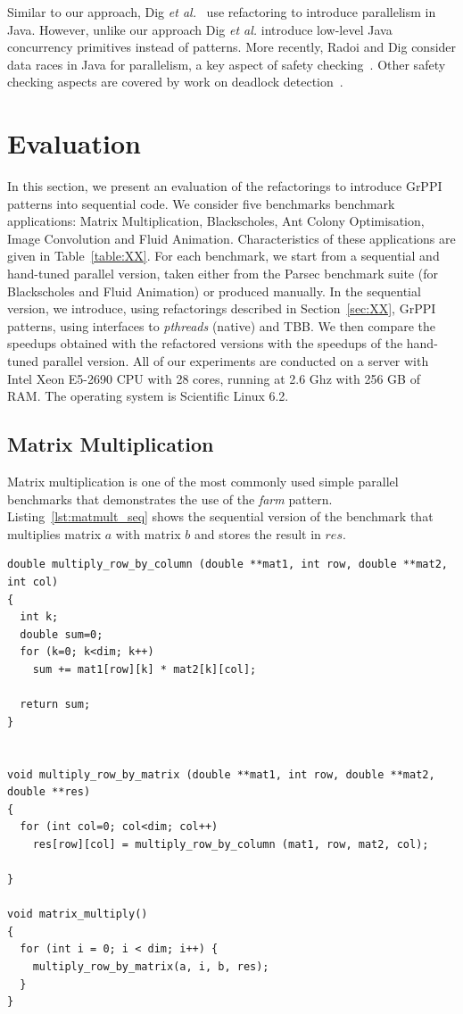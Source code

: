 Similar to our approach, Dig \textit{et al.}~\cite{dig} use refactoring to introduce parallelism in Java. However, unlike our approach Dig \textit{et al.} introduce low-level Java concurrency primitives instead of patterns. More recently,  Radoi and Dig consider data races in Java for parallelism, a key aspect of safety checking~\cite{DBLP:journals/tosem/RadoiD15}. Other safety checking aspects are covered by work on deadlock detection~\cite{DBLP:journals/tse/Corbett96}.


\section{Evaluation}

\noindent
In this section, we present an evaluation of the refactorings to introduce GrPPI patterns into sequential code. We consider five benchmarks benchmark applications: Matrix Multiplication, Blackscholes, Ant Colony Optimisation, Image Convolution and Fluid Animation. Characteristics of these applications are given in Table~\ref{table:XX}. For each benchmark, we start from a sequential and hand-tuned parallel version, taken either from the Parsec benchmark suite (for Blackscholes and Fluid Animation) or produced manually. In the sequential version, we introduce, using refactorings described in Section~\ref{sec:XX}, GrPPI patterns, using interfaces to \emph{pthreads} (native) and TBB. We then compare the speedups obtained with the refactored versions with the speedups of the hand-tuned parallel version. All of our experiments are conducted on a server with Intel Xeon E5-2690 CPU with 28 cores, running at 2.6 Ghz with 256 GB of RAM. The operating system is Scientific Linux 6.2.


\subsection{Matrix Multiplication}

\noindent Matrix multiplication is one of the most commonly used simple parallel benchmarks that demonstrates the use of the \emph{farm} pattern. Listing~\ref{lst:matmult_seq} shows the sequential version of the benchmark that multiplies matrix $a$ with matrix $b$ and stores the result in $res$.

\begin{small}
  \begin{lstlisting}[caption=Sequential Matrix Multiplication\label{lst:matmult_seq}]
double multiply_row_by_column (double **mat1, int row, double **mat2, int col)
{
  int k;
  double sum=0;
  for (k=0; k<dim; k++)
    sum += mat1[row][k] * mat2[k][col];

  return sum;
}


void multiply_row_by_matrix (double **mat1, int row, double **mat2, double **res)
{
  for (int col=0; col<dim; col++)
    res[row][col] = multiply_row_by_column (mat1, row, mat2, col);

}

void matrix_multiply()
{
  for (int i = 0; i < dim; i++) {
    multiply_row_by_matrix(a, i, b, res);
  }
}
  \end{lstlisting}
  
\end{small}

